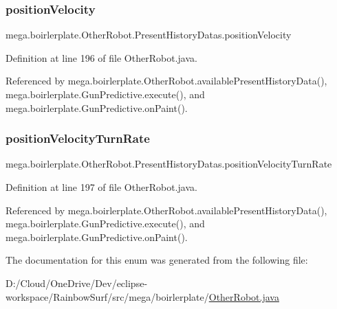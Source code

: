 \subsubsection{\texorpdfstring{position\+Velocity}{positionVelocity}}
{\footnotesize\ttfamily mega.\+boirlerplate.\+Other\+Robot.\+Present\+History\+Datas.\+position\+Velocity}



Definition at line 196 of file Other\+Robot.\+java.



Referenced by mega.\+boirlerplate.\+Other\+Robot.\+available\+Present\+History\+Data(), mega.\+boirlerplate.\+Gun\+Predictive.\+execute(), and mega.\+boirlerplate.\+Gun\+Predictive.\+on\+Paint().

\mbox{\label{enummega_1_1boirlerplate_1_1_other_robot_1_1_present_history_datas_ae96885748bb98009f6ad410778525bce}} 
\subsubsection{\texorpdfstring{position\+Velocity\+Turn\+Rate}{positionVelocityTurnRate}}
{\footnotesize\ttfamily mega.\+boirlerplate.\+Other\+Robot.\+Present\+History\+Datas.\+position\+Velocity\+Turn\+Rate}



Definition at line 197 of file Other\+Robot.\+java.



Referenced by mega.\+boirlerplate.\+Other\+Robot.\+available\+Present\+History\+Data(), mega.\+boirlerplate.\+Gun\+Predictive.\+execute(), and mega.\+boirlerplate.\+Gun\+Predictive.\+on\+Paint().



The documentation for this enum was generated from the following file\+:\begin{DoxyCompactItemize}
\item 
D\+:/\+Cloud/\+One\+Drive/\+Dev/eclipse-\/workspace/\+Rainbow\+Surf/src/mega/boirlerplate/\hyperlink{_other_robot_8java}{Other\+Robot.\+java}\end{DoxyCompactItemize}
